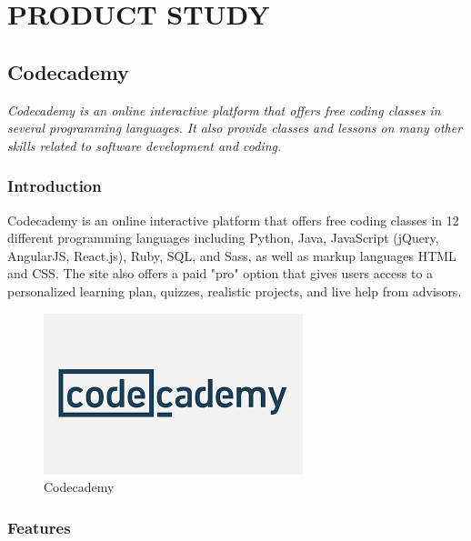 %       
%
\tableofcontents
{}
\listoffigures

\mainmatter



\chapter {PRODUCT STUDY}
\section {Codecademy}
{\em Codecademy is an online interactive platform that offers free coding classes in several programming languages. It also provide classes and lessons on many other skills related to software development and coding.}

\subsection{Introduction}    %

Codecademy is an online interactive platform that offers free coding classes in 12 different programming languages including Python, Java, JavaScript (jQuery, AngularJS, React.js), Ruby, SQL, and Sass, as well as markup languages HTML and CSS. The site also offers a paid "pro" option that gives users access to a personalized learning plan, quizzes, realistic projects, and live help from advisors.

\begin{figure}[h]
	\label{ss}    %
	\centering
	\includegraphics[width= 5 cm]{logo.jpeg}
	\caption{Codecademy}
\end{figure}




\subsection{Features }

